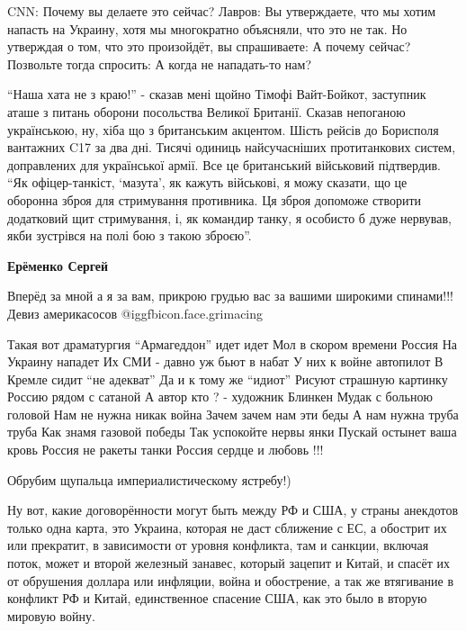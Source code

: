 \begin{itemize}

CNN: Почему вы делаете это сейчас? Лавров: Вы утверждаете, что мы хотим напасть
на Украину, хотя мы многократно объясняли, что это не так. Но утверждая о том,
что это произойдёт, вы спрашиваете: А почему сейчас? Позвольте тогда спросить:
А когда не нападать-то нам?



\enquote{Наша хата не з краю!} - сказав мені щойно Тімофі Вайт-Бойкот, заступник аташе
з питань оборони посольства Великої Британії. Сказав непоганою українською, ну,
хіба що з британським акцентом. Шість рейсів до Борисполя вантажних C17 за два
дні. Тисячі одиниць найсучасніших протитанкових систем, доправлених для
української армії. Все це британський військовий підтвердив. \enquote{Як
офіцер-танкіст, \enquote{мазута}, як кажуть військові, я можу сказати, що це оборонна
зброя для стримування противника. Ця зброя допоможе створити додатковий щит
стримування, і, як командир танку, я особисто б дуже нервував, якби зустрівся
на полі бою з такою зброєю}.

\textbf{Ерёменко Сергей}

Вперёд за мной а я за вам, прикрою грудью вас за вашими широкими спинами!!!
Девиз америкасосов @igg{fbicon.face.grimacing} 


\obeycr
Такая вот драматургия
\enquote{Армагеддон} идет идет
Мол в скором времени Россия
На Украину нападет
Их СМИ - давно уж бьют в набат
У них к войне автопилот
В Кремле сидит \enquote{не адекват}
Да и к тому же \enquote{идиот}
Рисуют страшную картинку
Россию рядом с сатаной
А автор кто ? - художник Блинкен
Мудак с больною головой
Нам не нужна никак война
Зачем зачем нам эти беды
А нам нужна труба труба
Как знамя газовой победы
Так успокойте нервы янки
Пускай остынет ваша кровь
Россия не ракеты танки
Россия сердце и любовь !!!
\restorecr

Обрубим щупальца империалистическому ястребу!)


Ну вот, какие договорённости могут быть между РФ и США, у страны анекдотов
только одна карта, это Украина, которая не даст сближение с ЕС, а обострит их
или прекратит, в зависимости от уровня конфликта, там и санкции, включая поток,
может и второй железный занавес, который зацепит и Китай, и спасёт их от
обрушения доллара или инфляции, война и обострение, а так же втягивание в
конфликт РФ и Китай, единственное спасение США, как это было в вторую мировую
войну.

\end{itemize} %
